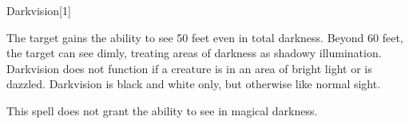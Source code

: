 \begin{spellsection}{Darkvision}[1]
    \begin{spellheader}
    \end{spellheader}
    \begin{spellcontent}
        \begin{spelltargetinginfo}
        \end{spelltargetinginfo}
        \begin{spelleffects}
            \spelleffect The target gains the ability to see 50 feet even in total darkness. Beyond 60 feet, the target can see dimly, treating areas of darkness as shadowy illumination. Darkvision does not function if a creature is in an area of bright light or is dazzled. Darkvision is black and white only, but otherwise like normal sight.
            \spelldur \durlong
        \end{spelleffects}
    \end{spellcontent}
    \begin{spellfooter}
        \spellnotes This spell does not grant the ability to see in magical darkness.
        \miscastexplode
    \end{spellfooter}
    \begin{spellaugments}
    \end{spellaugments}
\end{spellsection}

